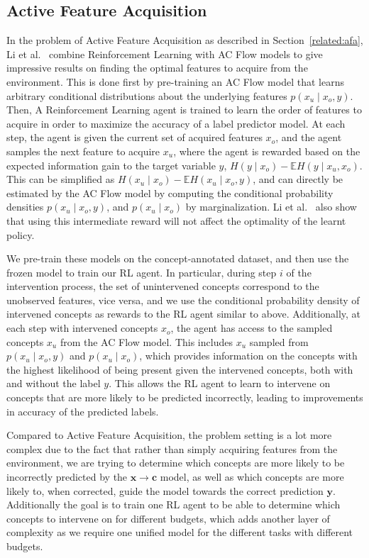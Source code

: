 \documentclass[../main.tex]{subfiles}
\begin{document}
\subsection{Active Feature Acquisition}

In the problem of Active Feature Acquisition as described in Section~\ref{related:afa},
Li et al.~\cite{afa} combine Reinforcement Learning with 
AC Flow models to give impressive results on finding the optimal features to acquire from the environment. This is done
first by pre-training an AC Flow model that learns arbitrary conditional distributions about the underlying
features $p(x_u \mid x_o, y)$. Then, A Reinforcement Learning agent is trained to learn 
the order of features to acquire in order to maximize the accuracy of a label predictor model. At each
step, the agent is given the current set of acquired features $x_o$, and the agent samples the next 
feature to acquire $x_u$, where the agent is rewarded based on the expected information gain
to the target variable $y$, $H(y \mid x_o) - \mathbb{E} H(y \mid x_u, x_o)$. This can be simplified as
$H(x_u \mid x_o) - \mathbb{E}H(x_u \mid x_o, y)$, and can directly be estimated by the AC 
Flow model by computing the conditional probability densities $p(x_u \mid x_o, y)$, and 
$p(x_u \mid x_o)$ by marginalization. Li et al.~\cite{afa} 
also show that using this intermediate reward will not affect the optimality of the learnt policy.


We pre-train these models on the concept-annotated dataset, and then use the frozen
model to train our RL agent.
In particular, during step $i$ of the intervention process, the set of unintervened concepts correspond 
to the unobserved features, vice versa, and we use the conditional probability density of 
intervened concepts as rewards to the RL agent similar to above. Additionally, at each step
with intervened concepts $x_o$, the agent has access to the sampled concepts $x_u$ from the AC Flow model.
This includes $x_u$ sampled from $p(x_u \mid x_o, y)$ and $p(x_u \mid x_o)$, which provides information
on the concepts with the highest likelihood of being present given the intervened concepts, both with and without
the label $y$.  This allows the RL agent to learn to intervene on concepts that are 
more likely to be predicted incorrectly, leading to improvements in accuracy of the predicted labels.

Compared to Active Feature Acquisition, the problem setting is a lot more complex due to the fact that
rather than simply acquiring features from the environment, we are trying to determine
which concepts are more likely to be incorrectly predicted by the $\mathbf{x} \to \mathbf{c}$ model, as well as 
which concepts are more likely to, when corrected, guide the model towards the correct prediction $\mathbf{y}$.
Additionally the goal is to train one RL agent to be able to determine which concepts
to intervene on for different budgets, which adds another layer of complexity as we require
one unified model for the different tasks with different budgets.
\end{document}
